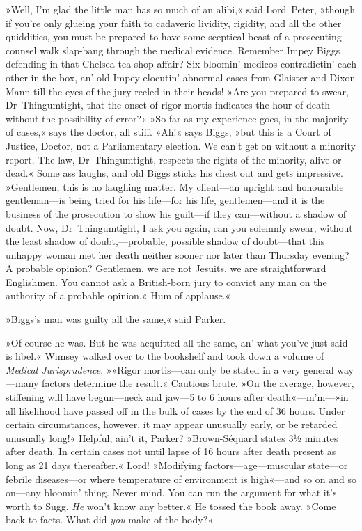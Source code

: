 »Well, I'm glad the little man has so much of an alibi,« said Lord~Peter, »though if you're only glueing your faith to cadaveric lividity, rigidity, and all the other quiddities, you must be prepared to have some sceptical beast of a prosecuting counsel walk slap-bang through the medical evidence. Remember Impey Biggs defending in that Chelsea tea-shop affair? Six bloomin' medicos contradictin' each other in the box, an' old Impey elocutin' abnormal cases from Glaister and Dixon Mann till the eyes of the jury reeled in their heads! »Are you prepared to swear, Dr~Thingumtight, that the onset of rigor mortis indicates the hour of death without the possibility of error?« »So far as my experience goes, in the majority of cases,« says the doctor, all stiff. »Ah!« says Biggs, »but this is a Court of Justice, Doctor, not a Parliamentary election. We can't get on without a minority report. The law, Dr~Thingumtight, respects the rights of the minority, alive or dead.« Some ass laughs, and old Biggs sticks his chest out and gets impressive. »Gentlemen, this is no laughing matter. My client—an upright and honourable gentleman—is being tried for his life—for his life, gentlemen—and it is the business of the prosecution to show his guilt—if they can—without a shadow of doubt. Now, Dr~Thingumtight, I ask you again, can you solemnly swear, without the least shadow of doubt,---probable, possible shadow of doubt—that this unhappy woman met her death neither sooner nor later than Thursday evening? A probable opinion? Gentlemen, we are not Jesuits, we are straightforward Englishmen. You cannot ask a British-born jury to convict any man on the authority of a probable opinion.« Hum of applause.«

»Biggs's man was guilty all the same,« said Parker.

»Of course he was. But he was acquitted all the same, an' what you've just said is libel.« Wimsey walked over to the bookshelf and took down a volume of \textit{Medical Jurisprudence}. »»Rigor mortis—can only be stated in a very general way—many factors determine the result.« Cautious brute. »On the average, however, stiffening will have begun—neck and jaw—5 to 6 hours after death«---m'm---»in all likelihood have passed off in the bulk of cases by the end of 36 hours. Under certain circumstances, however, it may appear unusually early, or be retarded unusually long!« Helpful, ain't it, Parker? »Brown-Séquard states \textellipsis 3½ minutes after death\textellipsis . In certain cases not until lapse of 16 hours after death \textellipsis present as long as 21 days thereafter.« Lord! »Modifying factors—age—muscular state—or febrile diseases—or where temperature of environment is high«---and so on and so on—any bloomin' thing. Never mind. You can run the argument for what it's worth to Sugg. \textit{He} won't know any better.« He tossed the book away. »Come back to facts. What did \textit{you} make of the body?«

